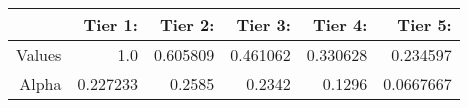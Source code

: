 \begin{tabular}{rrrrrr}
  \hline
   & \textbf{  Tier 1: } & \textbf{  Tier 2:} & \textbf{  Tier 3:} & \textbf{  Tier 4:} & \textbf{  Tier 5:} \\\hline
  Values & 1.0 & 0.605809 & 0.461062 & 0.330628 & 0.234597 \\
  Alpha & 0.227233 & 0.2585 & 0.2342 & 0.1296 & 0.0667667 \\\hline
\end{tabular}
